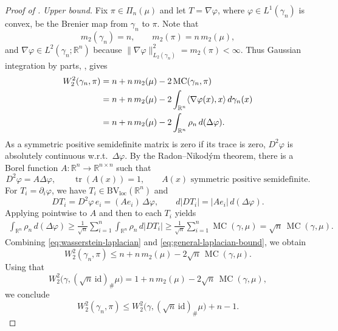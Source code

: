 \documentclass[10pt,a4paper]{amsart}
\newcommand{\BVloc}{\operatorname{BV_{loc}}}
\newcommand{\MC}{\operatorname{MC}}
\newcommand{\R}{\mathbb{R}}
\newcommand{\W}{W}
\newcommand{\mtwo}{m_2}
\newcommand{\tr}{\operatorname{tr}}
\begin{document}
\begin{proof}[Proof of ]
\emph{Upper bound.}
Fix $\pi\in\Pi_n(\mu)$ and let $T=\nabla\varphi$, where $\varphi \in L^1(\gamma_n)$ is convex, be the Brenier map
from $\gamma_n$ to $\pi$. Note that 
\[
  \mtwo(\gamma_n)=n,
  \qquad
  \mtwo(\pi)=n\,\mtwo(\mu),
\]
and $\nabla\varphi\in L^2(\gamma_n;\R^n)$ because $\| \nabla\varphi\|^2_{L_2(\gamma_n)} =   \mtwo(\pi) < \infty$. Thus Gaussian
integration by parts, , gives
\begin{align}\label{eq:wasserstein-laplacian}
  \W_2^2(\gamma_n,\pi)
  &=
  n+n\,\mtwo(\mu)
  -2\MC(\gamma_n,\pi) \notag\\
  &=
  n+n\,\mtwo(\mu)
  -2\int_{\R^n} \langle \nabla\varphi(x),x \rangle \, d\gamma_n(x) \notag \\
  &=
  n+n\,\mtwo(\mu)
  -2\int_{\R^n}\rho_n\,d(\Delta\varphi).
\end{align}
As a symmetric positive semidefinite matrix is zero if its trace is zero, $D^2\varphi$ is absolutely continuous w.r.t.\ $\Delta\varphi$. By the Radon--Nikodým theorem, there is a Borel function $A : \R^n \to \R^{n \times n}$ such that
\[
D^2 \varphi = A \Delta \varphi, \qquad \tr(A(x))=1, \qquad A(x) \text{ symmetric positive semidefinite}.
\]
For $T_i=\partial_i\varphi$, we have $T_i\in \BVloc(\R^n)$
and
\[
  D T_i=D^2\varphi\,e_i=(Ae_i)\,\Delta\varphi,
  \qquad
  d|D T_i|=|Ae_i|\,d(\Delta\varphi).
\]
Applying  pointwise to $A$ and then
 to each $T_i$ yields
\begin{align}\label{eq:general-laplacian-bound}
  \int_{\R^n}\rho_n\,d(\Delta\varphi)
  \geq
  \frac1{\sqrt n}\sum_{i=1}^n
  \int_{\R^n}\rho_n\,d|D T_i| 
  \geq
  \frac1{\sqrt n}\sum_{i=1}^n\MC(\gamma,\mu)
  =
  \sqrt n\,\MC(\gamma,\mu).
\end{align}
Combining \eqref{eq:wasserstein-laplacian} and
\eqref{eq:general-laplacian-bound}, we obtain
\[
  \W_2^2(\gamma_n,\pi)
  \leq
  n+n\,\mtwo(\mu)-2\sqrt n\,\MC(\gamma,\mu).
\]
Using that 
\[
  \W_2^2\bigl(\gamma,(\sqrt n\,\mathrm{id})_\#\mu\bigr)
  =
  1+n\,\mtwo(\mu)-2\sqrt n\,\MC(\gamma,\mu),
\]
we conclude 
\[
\W_2^2(\gamma_n,\pi) 
  \leq \W_2^2\bigl(\gamma,(\sqrt n\,\mathrm{id})_\#\mu\bigr) + n-1.
\]

\medskip


\end{proof}
\end{document}
